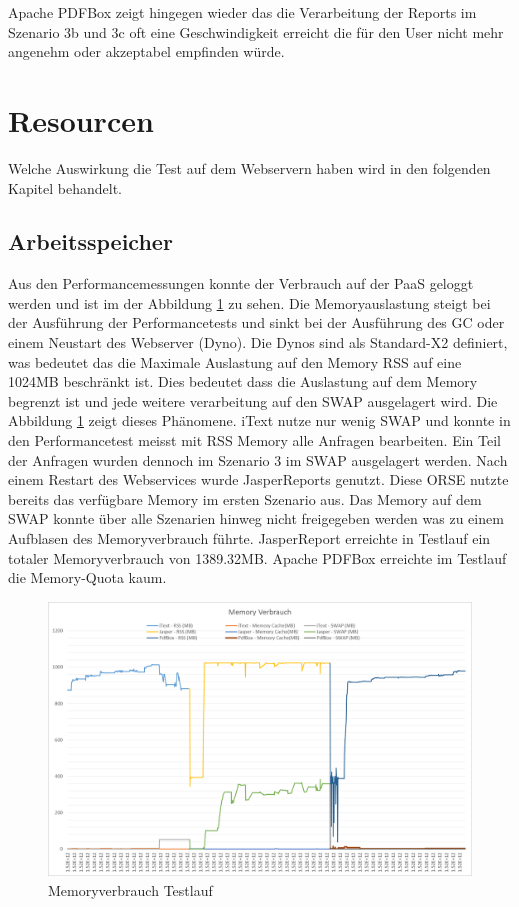 \documentclass[main.tex]{subfiles}
\begin{document}
Apache PDFBox zeigt hingegen wieder das die Verarbeitung der Reports im Szenario 3b und 3c oft eine Geschwindigkeit erreicht  die  für den User  nicht mehr angenehm oder akzeptabel empfinden würde. 









\section{Resourcen}

Welche Auswirkung die Test auf dem Webservern haben wird in den folgenden Kapitel behandelt. 

\subsection{Arbeitsspeicher}
Aus den Performancemessungen konnte der Verbrauch auf der PaaS geloggt werden und ist im der Abbildung \ref{figure:memorytestlauf} zu sehen. 
Die Memoryauslastung steigt bei der Ausführung der Performancetests und sinkt bei der Ausführung des GC oder einem Neustart des Webserver (Dyno). Die Dynos sind als Standard-X2 definiert, was bedeutet das die Maximale Auslastung auf den Memory RSS auf eine 1024MB beschränkt ist. Dies bedeutet dass die Auslastung auf dem Memory begrenzt ist und jede weitere verarbeitung auf den SWAP ausgelagert wird. 
Die Abbildung \ref{figure:memorytestlauf} zeigt dieses Phänomene. iText nutze nur wenig SWAP und konnte in den Performancetest meisst mit RSS Memory alle Anfragen bearbeiten. Ein Teil der Anfragen wurden dennoch im Szenario 3 im SWAP ausgelagert werden. 
Nach einem Restart des Webservices wurde JasperReports genutzt. Diese ORSE nutzte bereits das verfügbare Memory im ersten Szenario aus. Das Memory auf dem SWAP konnte über alle Szenarien hinweg nicht freigegeben werden was zu einem Aufblasen des Memoryverbrauch führte. JasperReport erreichte in Testlauf ein totaler Memoryverbrauch von 1389.32MB.
Apache PDFBox erreichte im Testlauf die Memory-Quota kaum. 


\begin{figure}[!ht]
\includegraphics[width=\textwidth]{mainpart/4_analyse_img/MemoryVerbrauch.png}
 \caption{Memoryverbrauch Testlauf}
 \label{figure:memorytestlauf}
\end{figure}
\end{document}
